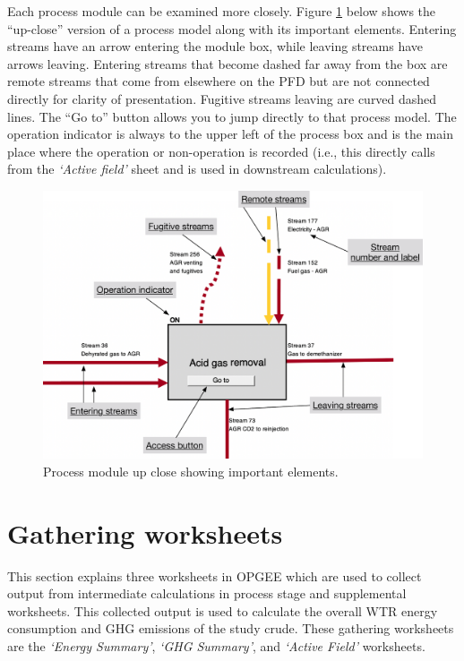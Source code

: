 \documentclass[11pt]{report}
\newcommand{\sheet}[1]{\textit{`{#1}'}}
\begin{document}
Each process module can be examined more closely. Figure \ref{fig:Process_mod_diagram} below shows the ``up-close'' version of a process model along with its important elements. Entering streams have an arrow entering the module box, while leaving streams have arrows leaving. Entering streams that become dashed far away from the box are remote streams that come from elsewhere on the PFD but are not connected directly for clarity of presentation. Fugitive streams leaving are curved dashed lines. The ``Go to'' button allows you to jump directly to that process model. The operation indicator is always to the upper left of the process box and is the main place where the operation or non-operation is recorded (i.e., this directly calls from the \sheet{Active field} sheet and is used in downstream calculations). 

\begin{figure}[t]
\includegraphics[width=1\columnwidth]{images/Process_mod_diagram.pdf}
\caption{Process module up close showing important elements.}
\label{fig:Process_mod_diagram}
\end{figure}



\chapter{Gathering worksheets}

This section explains three worksheets in OPGEE which are used to collect output from intermediate calculations in process stage and supplemental worksheets. This collected output is used to calculate the overall WTR energy consumption and GHG emissions of the study crude. These gathering worksheets are the \sheet{Energy Summary}, \sheet{GHG Summary}, and \sheet{Active Field} worksheets. 
\end{document}
